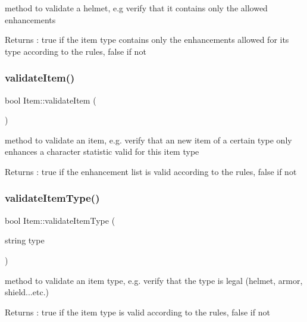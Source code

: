 method to validate a helmet, e.\+g verify that it contains only the allowed enhancements \begin{DoxyReturn}{Returns}
\+: true if the item type contains only the enhancements allowed for its type according to the rules, false if not 
\end{DoxyReturn}
\hypertarget{class_item_a6603371b60aaded48f697975c81fc25b}{}\label{class_item_a6603371b60aaded48f697975c81fc25b} 
\subsubsection{\texorpdfstring{validate\+Item()}{validateItem()}}
{\footnotesize\ttfamily bool Item\+::validate\+Item (\begin{DoxyParamCaption}{ }\end{DoxyParamCaption})}

method to validate an item, e.\+g. verify that an new item of a certain type only enhances a character statistic valid for this item type \begin{DoxyReturn}{Returns}
\+: true if the enhancement list is valid according to the rules, false if not 
\end{DoxyReturn}
\hypertarget{class_item_ad4a931d5e2a5f05252948432bea57985}{}\label{class_item_ad4a931d5e2a5f05252948432bea57985} 
\subsubsection{\texorpdfstring{validate\+Item\+Type()}{validateItemType()}}
{\footnotesize\ttfamily bool Item\+::validate\+Item\+Type (\begin{DoxyParamCaption}\item[{string}]{type }\end{DoxyParamCaption})}

method to validate an item type, e.\+g. verify that the type is legal (helmet, armor, shield...etc.) \begin{DoxyReturn}{Returns}
\+: true if the item type is valid according to the rules, false if not 
\end{DoxyReturn}
\hypertarget{class_item_a4a27008a17c7de44a94a84badc6010ca}{}\label{class_item_a4a27008a17c7de44a94a84badc6010ca} 
